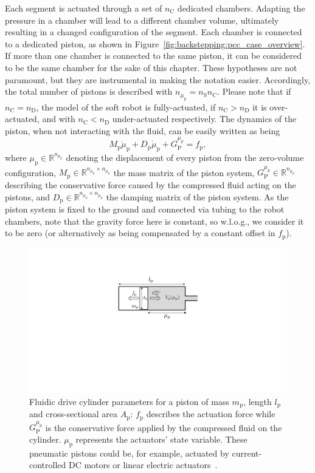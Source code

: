 %
Each segment is actuated through a set of $n_{\mathrm{C}}$ dedicated chambers.
%
Adapting the pressure in a chamber will lead to a different chamber volume, ultimately resulting in a changed configuration of the segment.
%
Each chamber is connected to a dedicated piston, as shown in Figure~\ref{fig:backstepping:pcc_case_overview}. If more than one chamber is connected to the same piston, it can be considered to be the same chamber for the sake of this chapter.
%
These hypotheses are not paramount, but they are instrumental in making the notation easier.
%
Accordingly, the total number of pistons is described with $n_{\mu_\mathrm{p}} = n_{\mathrm{S}} n_{\mathrm{C}}$.
%
Please note that if $n_\mathrm{C} = n_\mathrm{D}$, the model of the soft robot is fully-actuated, if $n_\mathrm{C} > n_\mathrm{D}$ it is over-actuated, and with $n_\mathrm{C} < n_\mathrm{D}$ under-actuated respectively.
%
The dynamics of the piston, when not interacting with the fluid, can be easily written as being
%
\begin{equation}
M_\mathrm{p} \ddot{\mu}_\mathrm{p} + D_\mathrm{p} \dot{\mu}_\mathrm{p} + G_{\mathrm{P}}^{\mu_p} = f_\mathrm{p},
\end{equation}
%
where $\mu_\mathrm{p} \in \mathbb{R}^{n_{\mu_\mathrm{p}}}$ denoting the displacement of every piston from the zero-volume configuration, $M_\mathrm{p} \in \mathbb{R}^{n_{\mu_\mathrm{p}} \times n_{\mu_\mathrm{p}}}$ the mass matrix of the piston system, $G_{\mathrm{P}}^{\mu_p} \in \mathbb{R}^{n_{\mu_\mathrm{p}}}$ describing the conservative force caused by the compressed fluid acting on the pistons, and $D_\mathrm{p} \in \mathbb{R}^{n_{\mu_\mathrm{p}} \times n_{\mu_\mathrm{p}}}$ the damping matrix of the piston system. 
As the piston system is fixed to the ground and connected via tubing to the robot chambers, note that the gravity force here is constant, so w.l.o.g., we consider it to be zero (or alternatively as being compensated by a constant offset in $f_\mathrm{p}$).

\begin{figure}[ht]
  \centering
  \includegraphics[width=0.5\columnwidth]{backstepping/figures/backstepping_graphics_fluidic_drive_cylinder_v4.pdf}
  \caption{Fluidic drive cylinder parameters for a piston of mass $m_\mathrm{p}$, length $l_\mathrm{p}$ and cross-sectional area $A_\mathrm{p}$: $f_\mathrm{p}$ describes the actuation force while $G_\mathrm{P}^{\mu_\mathrm{p}}$ is the conservative force applied by the compressed fluid on the cylinder. $\mu_\mathrm{p}$ represents the actuators' state variable. These pneumatic pistons could be, for example, actuated by current-controlled DC motors or linear electric actuators~\citep{marchese2014design}.}\label{fig:backstepping:fluidic_drive_cylinder}
\end{figure}

